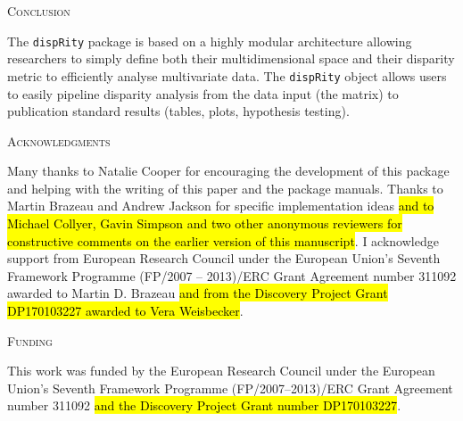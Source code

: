 \documentclass[12pt,letterpaper]{article}
\renewcommand{\section}[1]{%
\bigskip
\begin{center}
\begin{Large}
\normalfont\scshape #1
\medskip
\end{Large}
\end{center}}
\newcommand{\disp}{\texttt{dispRity} }
\begin{document}
\section{Conclusion}
The \disp package is based on a highly modular architecture allowing researchers to simply define both their multidimensional space and their disparity metric to efficiently analyse multivariate data.
The \disp object allows users to easily pipeline disparity analysis from the data input (the matrix) to publication standard results (tables, plots, hypothesis testing).


\section{Acknowledgments}
Many thanks to Natalie Cooper for encouraging the development of this package and helping with the writing of this paper and the package manuals.
Thanks to Martin Brazeau and Andrew Jackson for specific implementation ideas 
\hl{and to Michael Collyer, Gavin Simpson and two other anonymous reviewers for constructive comments on the earlier version of this manuscript}. %
I acknowledge support from European Research Council under the European Union's Seventh Framework Programme (FP/2007 – 2013)/ERC Grant Agreement number 311092 awarded to Martin D. Brazeau 
\hl{and from the Discovery Project Grant DP170103227 awarded to Vera Weisbecker}.


\section{Funding}
This work was funded by the European Research Council under the European Union's Seventh Framework Programme (FP/2007–2013)/ERC Grant Agreement number 311092 
\hl{and the Discovery Project Grant number DP170103227}.



\end{document}
